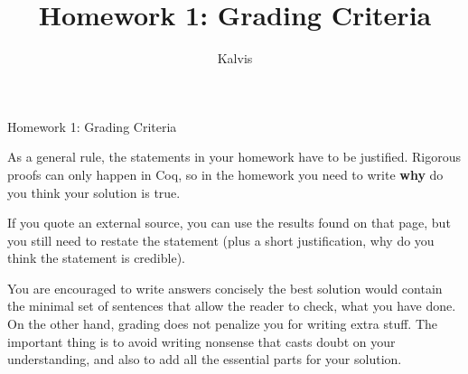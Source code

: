 \documentclass[jou]{apa6}
\title{Homework 1: Grading Criteria}
\author{Kalvis}
\affiliation{RBS}
\begin{document}
\thispagestyle{empty}

\twocolumn
{\Large Homework 1: Grading Criteria}

As a general rule, the statements in your homework have to be justified. 
Rigorous proofs can only happen in Coq, so in the homework you need to 
write {\bf why} do you think your solution is true.

If you quote an external source, you can use the results found on that page, but 
you still need to restate the statement (plus a short justification, why do you 
think the statement is credible). 

You are encouraged to write answers concisely \textendash{} the best solution would contain the 
minimal set of sentences that allow the reader to check, what you have done. 
On the other hand, grading does not penalize you for writing extra stuff.
The important thing is to avoid writing nonsense that casts doubt on your understanding, 
and also to add all the essential parts for your solution. 
\end{document}

